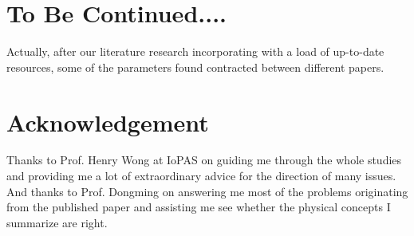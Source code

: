 \documentclass[%
 reprint,
 amsmath,amssymb,
 aps,
]{revtex4-2}
\begin{document}
\section{To Be Continued....}
Actually, after our literature research incorporating with a load of up-to-date resources, some of the parameters found contracted between different papers. 

\section{Acknowledgement}
Thanks to Prof. Henry Wong at IoPAS on guiding me through the whole studies and providing me a lot of extraordinary advice for the direction of many issues. And thanks to Prof. Dongming on answering me most of the problems originating from the published paper and assisting me see whether the physical concepts I summarize are right.


\end{document}
